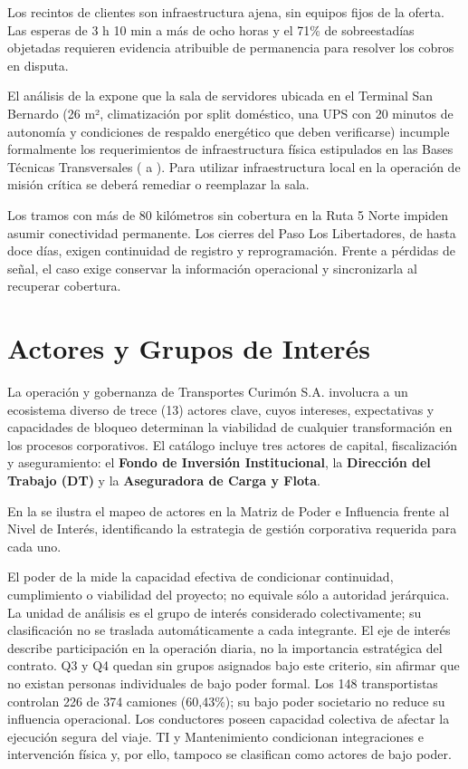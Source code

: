 Los recintos de clientes son infraestructura ajena, sin equipos fijos de la oferta. Las esperas de 3 h 10 min a más de ocho horas y el 71\% de sobreestadías objetadas requieren evidencia atribuible de permanencia para resolver los cobros en disputa.

El análisis de la  expone que la sala de servidores ubicada en el Terminal San Bernardo (26 m², climatización por split doméstico, una UPS con 20 minutos de autonomía y condiciones de respaldo energético que deben verificarse) incumple formalmente los requerimientos de infraestructura física estipulados en las Bases Técnicas Transversales ( a ). Para utilizar infraestructura local en la operación de misión crítica se deberá remediar o reemplazar la sala.

Los tramos con más de 80 kilómetros sin cobertura en la Ruta 5 Norte impiden asumir conectividad permanente. Los cierres del Paso Los Libertadores, de hasta doce días, exigen continuidad de registro y reprogramación. Frente a pérdidas de señal, el caso exige conservar la información operacional y sincronizarla al recuperar cobertura.

\section{Actores y Grupos de Interés}\label{sec:2-actores}

La operación y gobernanza de Transportes Curimón S.A. involucra a un ecosistema diverso de trece (13) actores clave, cuyos intereses, expectativas y capacidades de bloqueo determinan la viabilidad de cualquier transformación en los procesos corporativos. El catálogo incluye tres actores de capital, fiscalización y aseguramiento: el \textbf{Fondo de Inversión Institucional}, la \textbf{Dirección del Trabajo (DT)} y la \textbf{Aseguradora de Carga y Flota}.

En la  se ilustra el mapeo de actores en la Matriz de Poder e Influencia frente al Nivel de Interés, identificando la estrategia de gestión corporativa requerida para cada uno.


El poder de la  mide la capacidad efectiva de condicionar continuidad, cumplimiento o viabilidad del proyecto; no equivale sólo a autoridad jerárquica. La unidad de análisis es el grupo de interés considerado colectivamente; su clasificación no se traslada automáticamente a cada integrante. El eje de interés describe participación en la operación diaria, no la importancia estratégica del contrato. Q3 y Q4 quedan sin grupos asignados bajo este criterio, sin afirmar que no existan personas individuales de bajo poder formal. Los 148 transportistas controlan 226 de 374 camiones (60,43\%); su bajo poder societario no reduce su influencia operacional. Los conductores poseen capacidad colectiva de afectar la ejecución segura del viaje. TI y Mantenimiento condicionan integraciones e intervención física y, por ello, tampoco se clasifican como actores de bajo poder.

